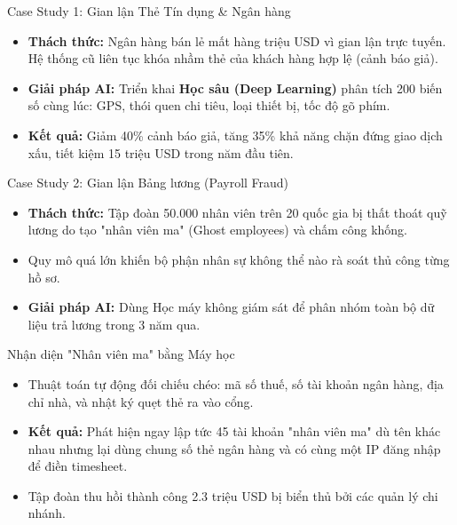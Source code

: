 \documentclass[aspectratio=169]{beamer}
\begin{document}
\begin{frame}{Case Study 1: Gian lận Thẻ Tín dụng \& Ngân hàng}
    \begin{itemize}
        \item \textbf{Thách thức:} Ngân hàng bán lẻ mất hàng triệu USD vì gian lận trực tuyến. Hệ thống cũ liên tục khóa nhầm thẻ của khách hàng hợp lệ (cảnh báo giả).
        \item \textbf{Giải pháp AI:} Triển khai \textbf{Học sâu (Deep Learning)} phân tích 200 biến số cùng lúc: GPS, thói quen chi tiêu, loại thiết bị, tốc độ gõ phím.
        \item \textbf{Kết quả:} Giảm 40\% cảnh báo giả, tăng 35\% khả năng chặn đứng giao dịch xấu, tiết kiệm 15 triệu USD trong năm đầu tiên.
    \end{itemize}
\end{frame}

\begin{frame}{Case Study 2: Gian lận Bảng lương (Payroll Fraud)}
    \begin{itemize}
        \item \textbf{Thách thức:} Tập đoàn 50.000 nhân viên trên 20 quốc gia bị thất thoát quỹ lương do tạo "nhân viên ma" (Ghost employees) và chấm công khống.
        \item Quy mô quá lớn khiến bộ phận nhân sự không thể nào rà soát thủ công từng hồ sơ.
        \item \textbf{Giải pháp AI:} Dùng Học máy không giám sát để phân nhóm toàn bộ dữ liệu trả lương trong 3 năm qua.
    \end{itemize}
\end{frame}

\begin{frame}{Nhận diện "Nhân viên ma" bằng Máy học}
    \begin{itemize}
        \item Thuật toán tự động đối chiếu chéo: mã số thuế, số tài khoản ngân hàng, địa chỉ nhà, và nhật ký quẹt thẻ ra vào cổng.
        \item \textbf{Kết quả:} Phát hiện ngay lập tức 45 tài khoản "nhân viên ma" dù tên khác nhau nhưng lại dùng chung số thẻ ngân hàng và có cùng một IP đăng nhập để điền timesheet.
        \item Tập đoàn thu hồi thành công 2.3 triệu USD bị biển thủ bởi các quản lý chi nhánh.
    \end{itemize}
\end{frame}
\end{document}
